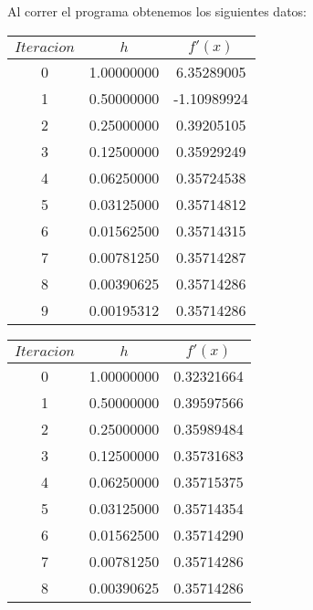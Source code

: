 
Al correr el programa obtenemos los siguientes datos:

\begin{center}
	\begin{longtable}{|c|c|c|} \hline
		$Iteracion$   & $h$   & $f'(x)$ \\ \hline \hline
		0 & 1.00000000 & 6.35289005 \\ \hline
		1 & 0.50000000 & -1.10989924 \\ \hline
		2 & 0.25000000 & 0.39205105 \\ \hline
		3 & 0.12500000 & 0.35929249 \\ \hline
		4 & 0.06250000 & 0.35724538 \\ \hline
		5 & 0.03125000 & 0.35714812 \\ \hline
		6 & 0.01562500 & 0.35714315 \\ \hline
		7 & 0.00781250 & 0.35714287 \\ \hline
		8 & 0.00390625 & 0.35714286 \\ \hline
		9 & 0.00195312 & 0.35714286 \\ \hline
	\end{longtable}
\end{center}

\begin{center}
	\begin{longtable}{|c|c|c|} \hline
		$Iteracion$   & $h$   & $f'(x)$ \\ \hline \hline
		0 & 1.00000000 & 0.32321664 \\ \hline
		1 & 0.50000000 & 0.39597566 \\ \hline
		2 & 0.25000000 & 0.35989484 \\ \hline
		3 & 0.12500000 & 0.35731683 \\ \hline
		4 & 0.06250000 & 0.35715375 \\ \hline
		5 & 0.03125000 & 0.35714354 \\ \hline
		6 & 0.01562500 & 0.35714290 \\ \hline
		7 & 0.00781250 & 0.35714286 \\ \hline
		8 & 0.00390625 & 0.35714286 \\ \hline
	\end{longtable}
\end{center}